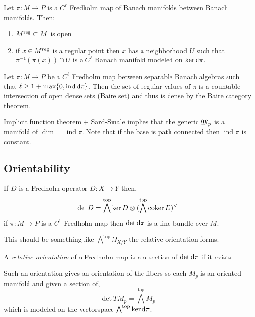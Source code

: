 \documentclass[12pt]{article}
\DeclareMathOperator{\ind}{\mathrm{ind}}
\begin{document}
\begin{thm}
Let $\pi : M \to P$ is a $C^\ell$ Fredholm map of Banach manifolds between Banach manifolds. Then:
\begin{enumerate}
\item $M^{\mathrm{reg}} \subset M$ is open
\item if $x \in M^{\mathrm{reg}}$ is a regular point then $x$ has a neighborhood $U$ such that $\pi^{-1}(\pi(x)) \cap U$ is a $C^\ell$ Banach manifold modeled on $\ker{\mathrm{d}{\pi}}$. 
\end{enumerate}
\end{thm}

\begin{thm}
Let $\pi : M \to P$ be a $C^\ell$ Fredholm map between separable Banach algebras such that $\ell \ge 1 + \max \{ 0, \ind{\d{\pi}} \}$. Then the set of regular values of $\pi$ is a countable intersection of open dense sets (Baire set) and thus is dense by the Baire category theorem. 
\end{thm}

\begin{cor}
Implicit function theorem + Sard-Smale implies that the generic $\mathfrak{M}_p$ is a manifold of $\dim = \ind{\pi}$. Note that if the base is path connected then $\ind{\pi}$ is constant. 
\end{cor}

\subsection{Orientability}

If $D$ is a Fredholm operator $D : X \to Y$ then,
\[ \det{D} = \bigwedge^{\mathrm{top}} \ker{D} \otimes (\bigwedge^{\mathrm{top}} \operatorname{\mathrm{coker}}{D})^\vee \]
if $\pi : M \to P$ is a $C^1$ Fredholm map then $\det{\mathrm{d}{\pi}}$ is a line bundle over $M$.

\begin{rmk}
This should be something like $\bigwedge^{\mathrm{top}} \Omega_{X/Y}$ the relative orientation forms.
\end{rmk}

\begin{defn}
A \textit{relative orientation} of a Fredholm map is a a section of $\det{\mathrm{d}{\pi}}$ if it exists.
\end{defn}

\begin{rmk}
Such an orientation gives an orientation of the fibers so each $M_p$ is an oriented manifold and given a section of,
\[ \det{TM_p} = \bigwedge^{\mathrm{top}} M_p \]
which is modeled on the vectorspace $\bigwedge^{\mathrm{top}} \ker{\mathrm{d}{\pi}}$. 
\end{rmk}
\end{document}
